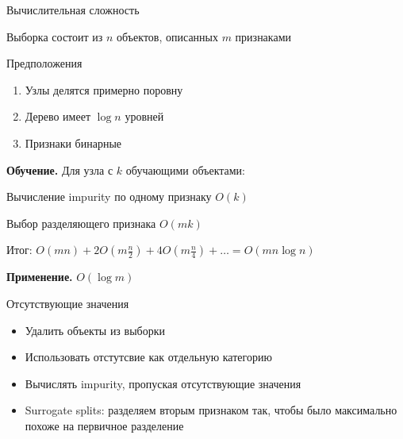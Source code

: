 \documentclass[aspectratio=169]{beamer}
\begin{document}
\begin{frame}{Вычислительная сложность}

Выборка состоит из $n$ объектов, описанных $m$ признаками

\vspace{1em}
Предположения
\begin{enumerate}
\item Узлы делятся примерно поровну
\item Дерево имеет $\log n$ уровней
\item Признаки бинарные
\end{enumerate}

\vspace{1em}
{\bf Обучение. } Для узла с $k$ обучающими объектами:

\vspace{1em}
\hspace{1em}Вычисление impurity по одному признаку $O(k)$

\hspace{1em}Выбор разделяющего признака $O(mk)$

\hspace{1em}Итог: $O(mn) + 2 O(m \frac{n}{2}) + 4 O(m \frac{n}{4}) + \ldots = O(m n \log n)$

\vspace{1em}
{\bf Применение. } $O(\log m)$

\end{frame}

\begin{frame}{Отсутствующие значения}

\begin{itemize}
\item Удалить объекты из выборки
\item Использовать отстутсвие как отдельную категорию
\item Вычислять impurity, пропуская отсутствующие значения
\item Surrogate splits: разделяем вторым признаком так, чтобы было максимально похоже на первичное разделение
\end{itemize}

\end{frame}
\end{document}

